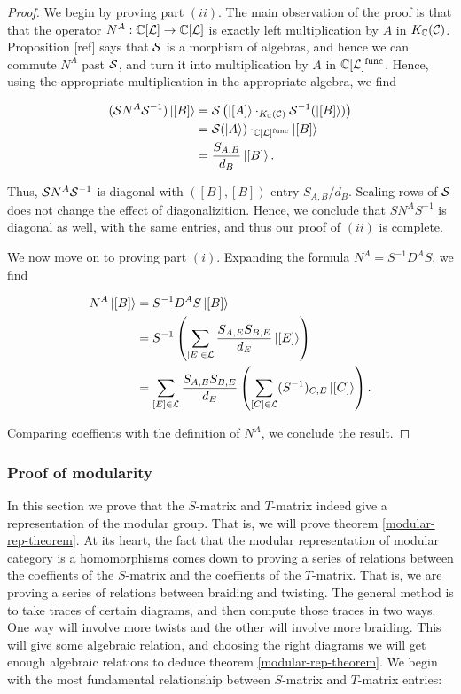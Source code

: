 \begin{proof} We begin by proving part $(ii)$. The main observation of the proof is that that the operator $N^{A}:{\mathbb C}[{\mathcal L}]\to{\mathbb C}[{\mathcal L}]$ is exactly left multiplication by $A$ in $K_{{\mathbb C}}({\mathcal C})$. Proposition [ref] says that ${\mathcal S}$ is a morphism of algebras, and hence we can commute $N^{A}$ past ${\mathcal S}$, and turn it into multiplication by $A$ in ${\mathbb C}[{\mathcal L}]^{\text{func}}$. Hence, using the appropriate multiplication in the appropriate algebra, we find

\begin{align*}
({\mathcal S} N^{A}{\mathcal S}^{-1}) \ket{[B]} & = {\mathcal S} \left(\ket{[A]} \cdot_{K_{{\mathbb C}}({\mathcal C})} {\mathcal S}^{-1}(\ket{[B]})\right)\\
& = {\mathcal S}(\ket{A}) \cdot_{{\mathbb C}[{\mathcal L}]^{\text{func}}} \ket{[B]}\\
& = \frac{S_{A,B}}{d_B}\ket{[B]}.
\end{align*}

Thus, ${\mathcal S} N^{A}{\mathcal S}^{-1}$ is diagonal with $([B],[B])$ entry $S_{A,B}/d_B$. Scaling rows of ${\mathcal S}$ does not change the effect of diagonalizition. Hence, we conclude that $S N^{A}S^{-1}$ is diagonal as well, with the same entries, and thus our proof of $(ii)$ is complete.

We now move on to proving part $(i)$. Expanding the formula $N^{A}=S^{-1}D^{A}S$, we find

\begin{align*}
N^{A}\ket{[B]} &= S^{-1}D^{A}S \ket{[B]}\\
&=S^{-1}\left(\sum_{[E]\in{\mathcal L}}\frac{S_{A,E} S_{B,E}}{d_E}\ket{[E]}\right)\\
&=\sum_{[E]\in{\mathcal L}}\frac{S_{A,E} S_{B,E}}{d_E}\left(\sum_{[C]\in {\mathcal L}}(S^{-1})_{C,E}\ket{[C]}\right).\\
\end{align*}

Comparing coeffients with the definition of $N^{A}$, we conclude the result.

\end{proof}


\subsubsection{Proof of modularity}

In this section we prove that the $S$-matrix and $T$-matrix indeed give a representation of the modular group. That is, we will prove theorem \ref{modular-rep-theorem}. At its heart, the fact that the modular representation of modular category is a homomorphisms comes down to proving a series of relations between the coeffients of the $S$-matrix and the coeffients of the $T$-matrix. That is, we are proving a series of relations between braiding and twisting. The general method is to take traces of certain diagrams, and then compute those traces in two ways. One way will involve more twists and the other will involve more braiding. This will give some algebraic relation, and choosing the right diagrams we will get enough algebraic relations to deduce theorem \ref{modular-rep-theorem}. We begin with the most fundamental relationship between $S$-matrix and $T$-matrix entries:


